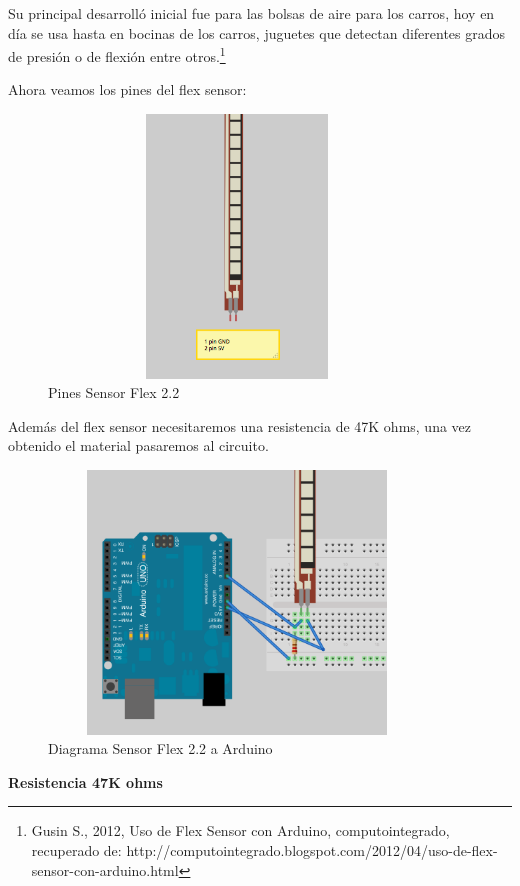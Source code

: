 \documentclass[12pt]{report}%
\begin{document}
Su principal desarrolló inicial fue para las bolsas de aire para los carros, hoy en día se usa hasta en bocinas de los carros, juguetes que detectan diferentes grados de presión o de flexión entre otros.\footnote{Gusin S., 2012, Uso de Flex Sensor con Arduino, computointegrado, recuperado de: http://computointegrado.blogspot.com/2012/04/uso-de-flex-sensor-con-arduino.html}   

Ahora veamos los pines del flex sensor:
\newpage
\begin{figure}[H]
\centering
	 \includegraphics[width=10cm, height=7cm]{pines-sensor.png}
	 \caption[Pines Sensor Flex 2.2]{Pines Sensor Flex 2.2  }%
	 	 \label{fig:PinessensorFlex}
\end{figure}
Además del flex sensor necesitaremos una resistencia de 47K ohms, una vez obtenido el material pasaremos al circuito.
\begin{figure}[H]
\centering
	 \includegraphics[width=10cm, height=7cm]{diagrama-de-sensor.png}
	 \caption[Diagrama Sensor Flex 2.2 a Arduino]{Diagrama Sensor Flex 2.2 a Arduino   }%
	 	 \label{fig:DiagramasensorFlex}
\end{figure}

\newpage
\textbf{Resistencia 47K ohms}
\end{document}
